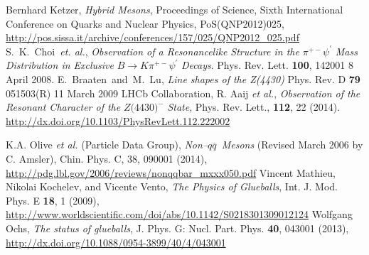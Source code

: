 \documentclass[mathserif,18pt,xcolor=table]{beamer}
\DeclareRobustCommand{\qqbar}{$q\overline{q}$}
\begin{document}
\begin{thebibliography}{9}
  Bernhard Ketzer, \textit{Hybrid Mesons}, Proceedings of Science, Sixth International Conference on Quarks and Nuclear Physics, PoS(QNP2012)025, \url{http://pos.sissa.it/archive/conferences/157/025/QNP2012_025.pdf} %
  S.~K.~Choi~\emph{et. al.}, \emph{Observation of a Resonancelike Structure in the} $\pi^{+-}\psi^{\prime}$ \emph{Mass Distribution in Exclusive} $B\rightarrow K \pi^{+-}\psi^{\prime}$ \emph{Decays}. Phys. Rev. Lett. \textbf{100}, 142001 8 April 2008.
  E.~Braaten~and~M.~Lu, \emph{Line shapes of the Z(4430)} Phys. Rev. D \textbf{79} 051503(R) 11 March 2009
  LHCb Collaboration, R. Aaij \textit{et al.}, \textit{Observation of the Resonant Character of the }$Z(4430{)}^{-}$\textit{ State}, Phys. Rev. Lett., \textbf{112}, 22 (2014). \url{http://dx.doi.org/10.1103/PhysRevLett.112.222002}%

  K.A. Olive \textit{et al.} (Particle Data Group), \textit{Non--\qqbar~Mesons} (Revised March 2006 by C. Amsler), Chin. Phys. C, 38, 090001 (2014), \url{http://pdg.lbl.gov/2006/reviews/nonqqbar_mxxx050.pdf}
  Vincent Mathieu, Nikolai Kochelev, and Vicente Vento, \emph{The Physics of Glueballs}, Int. J. Mod. Phys. E \textbf{18}, 1 (2009), \url{http://www.worldscientific.com/doi/abs/10.1142/S0218301309012124}
  Wolfgang Ochs, \emph{The status of glueballs}, J. Phys. G: Nucl. Part. Phys. \textbf{40}, 043001 (2013), \url{http://dx.doi.org/10.1088/0954-3899/40/4/043001}

\end{thebibliography}
\end{document}
